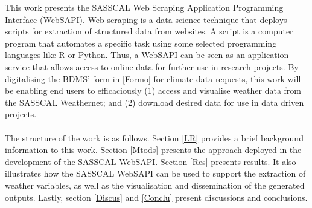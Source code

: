 \documentclass[a4paper, 10pt, conference]{ieeeconf}      %
\begin{document}
 \noindent
This work presents the SASSCAL Web Scraping Application Programming Interface (WebSAPI).  
%	
%	
Web scraping \cite{WebSrapping} is a data science technique that deploys scripts for extraction  of structured data from websites. %
 A script is a computer program that automates a specific task using some selected programming languages like R or Python. 
 Thus, a WebSAPI can be seen as an application service that allows access to online data for further use in research projects. 	 
By digitalising the  BDMS' form in \ref{Formo} for climate data requests, this work will be enabling end users to efficaciously (1) access and visualise weather data from the   SASSCAL Weathernet; and (2) download desired data  for  use in  data driven  projects.   %
\\
\\
The structure of the work is as follows. Section \ref{LR} provides a   brief background information to   this work. Section \ref{Mtods} presents the   approach deployed in the development of the SASSCAL WebSAPI. %
   Section \ref{Res} presents results. It also illustrates how the SASSCAL WebSAPI can be used to support the extraction of weather variables, as well as the visualisation and dissemination of the generated outputs. %
Lastly, section \ref{Discus} and  \ref{Conclu} present discussions and conclusions. %
\end{document}
